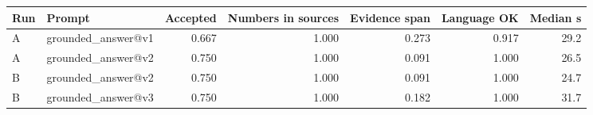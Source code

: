\begin{tabular}{@{}llrrrrr@{}}
\toprule
Run & Prompt & Accepted & Numbers in sources & Evidence span & Language OK & Median s \\
\midrule
A & grounded\_answer@v1 & 0.667 & 1.000 & 0.273 & 0.917 & 29.2 \\
A & grounded\_answer@v2 & 0.750 & 1.000 & 0.091 & 1.000 & 26.5 \\
\addlinespace[1pt]
B & grounded\_answer@v2 & 0.750 & 1.000 & 0.091 & 1.000 & 24.7 \\
B & grounded\_answer@v3 & 0.750 & 1.000 & 0.182 & 1.000 & 31.7 \\
\bottomrule
\end{tabular}
